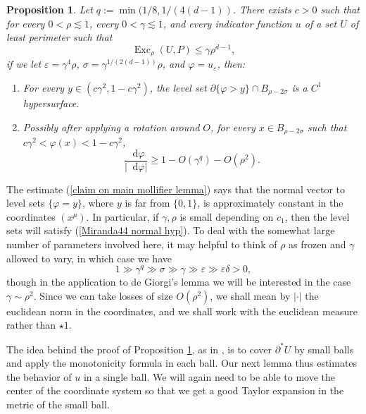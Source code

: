 \documentclass[reqno,11pt]{amsart}
\DeclareMathOperator{\Exc}{Exc}
\newcommand*\dif{\mathop{}\!\mathrm{d}}
\newtheorem{proposition}[theorem]{Proposition}
\theoremstyle{definition}
\numberwithin{equation}{section}
\begin{document}
\begin{proposition}\label{main mollifier lemma}
Let $q := \min(1/8, 1/(4(d - 1))$.
There exists $c > 0$ such that for every $0 < \rho \lesssim 1$, every $0 < \gamma \lesssim 1$, and every indicator function $u$ of a set $U$ of least perimeter such that
\begin{equation}\label{hypothesis on main mollifier lemma}
\Exc_\rho(U, P) \leq \gamma \rho^{d - 1},
\end{equation}
if we let $\varepsilon = \gamma^4\rho$, $\sigma = \gamma^{1/(2(d - 1))}\rho$, and $\varphi = u_\varepsilon$, then:
\begin{enumerate}
\item For every $y \in (c\gamma^2, 1 - c\gamma^2)$, the level set $\partial \{\varphi > y\} \cap B_{\rho - 2\sigma}$ is a $C^1$ hypersurface.
\item Possibly after applying a rotation around $O$, for every $x \in B_{\rho - 2\sigma}$ such that $c\gamma^2 < \varphi(x) < 1 - c\gamma^2$,
\begin{equation}\label{claim on main mollifier lemma}
\frac{\dif \varphi}{|\dif \varphi|} \geq 1 - O(\gamma^q) - O(\rho^2).
\end{equation}
\end{enumerate}
\end{proposition}

The estimate (\ref{claim on main mollifier lemma}) says that the normal vector to level sets $\{\varphi = y\}$, where $y$ is far from $\{0, 1\}$, is approximately constant in the coordinates $(x^\mu)$.
In particular, if $\gamma, \rho$ is small depending on $c_1$, then the level sets will satisfy (\ref{Miranda44 normal hyp}).
To deal with the somewhat large number of parameters involved here, it may helpful to think of $\rho$ as frozen and $\gamma$ allowed to vary, in which case we have
$$1 \gg \gamma^q \gg \sigma \gg \gamma \gg \varepsilon \gg \varepsilon \delta > 0,$$
though in the application to de Giorgi's lemma we will be interested in the case $\gamma \sim \rho^2$.
Since we can take losses of size $O(\rho^2)$, we shall mean by $|\cdot|$ the euclidean norm in the coordinates, and we shall work with the euclidean measure rather than $\star 1$.

The idea behind the proof of Proposition \ref{main mollifier lemma}, as in \cite{Giusti77}, is to cover $\partial^* U$ by small balls and apply the monotonicity formula in each ball.
Our next lemma thus estimates the behavior of $u$ in a single ball.
We will again need to be able to move the center of the coordinate system so that we get a good Taylor expansion in the metric of the small ball.
\end{document}
